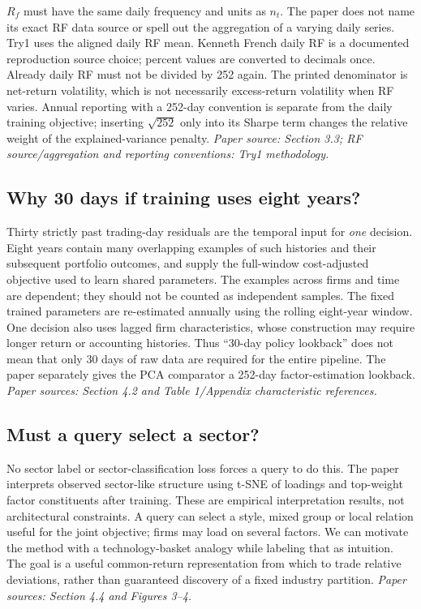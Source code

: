 \documentclass[11pt]{article}
\begin{document}
$R_f$ must have the same daily frequency and units as $n_t$. The paper
does not name its exact RF data source or spell out the aggregation of a
varying daily series. Try1 uses the aligned daily RF mean. Kenneth French
daily RF is a documented reproduction source choice; percent values are
converted to decimals once. Already daily RF must not be divided by 252
again. The printed denominator is net-return volatility, which is not
necessarily excess-return volatility when RF varies. Annual reporting
with a 252-day convention is separate from the daily training objective;
inserting $\sqrt{252}$ only into its Sharpe term changes the relative
weight of the explained-variance penalty.
\emph{Paper source: Section 3.3; RF source/aggregation and reporting
conventions: Try1 methodology.}

\subsection{Why 30 days if training uses eight years?}

Thirty strictly past trading-day residuals are the temporal input for
\emph{one} decision. Eight years contain many overlapping examples of
such histories and their subsequent portfolio outcomes, and supply the
full-window cost-adjusted objective used to learn shared parameters.
The examples across firms and time are dependent; they should not be
counted as independent samples. The fixed trained parameters are
re-estimated annually using the rolling eight-year window. One decision
also uses lagged firm characteristics, whose construction may require
longer return or accounting histories. Thus ``30-day policy lookback''
does not mean that only 30 days of raw data are required for the entire
pipeline. The paper separately gives the PCA comparator a 252-day
factor-estimation lookback.
\emph{Paper sources: Section 4.2 and Table 1/Appendix characteristic
references.}

\subsection{Must a query select a sector?}

No sector label or sector-classification loss forces a query to do this.
The paper interprets observed sector-like structure using t-SNE of
loadings and top-weight factor constituents after training. These are
empirical interpretation results, not architectural constraints. A
query can select a style, mixed group or local relation useful for the
joint objective; firms may load on several factors. We can motivate
the method with a technology-basket analogy while labeling that as
intuition. The goal is a useful common-return representation from which
to trade relative deviations, rather than guaranteed discovery of a
fixed industry partition.
\emph{Paper sources: Section 4.4 and Figures 3--4.}
\end{document}
